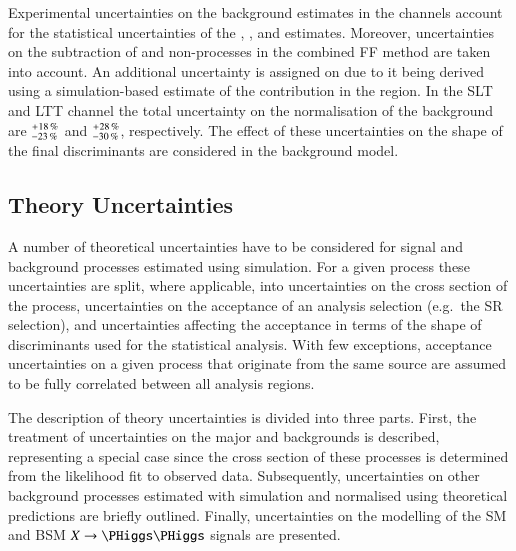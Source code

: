 Experimental uncertainties on the \faketauhadvis background estimates in the
\lephad channels account for the statistical uncertainties of the \FFqcd,
\FFttbar, and \rqcd estimates. Moreover, uncertainties on the subtraction of
\ttbar and non-\ttbar processes in the combined FF method are taken into
account. An additional uncertainty is assigned on \rqcd due to it being derived
using a simulation-based estimate of the \ttbarFakes contribution in the \antiid
region. In the \lephad SLT and LTT channel the total uncertainty on the
normalisation of the \faketauhadvis background are
$^{\hspace{0.25pt}+\hspace{0.25pt}18\,\%}_{-23\,\%}$ and
$^{\hspace{0.25pt}+\hspace{0.25pt}28\,\%}_{-30\,\%}$, respectively. The effect
of these uncertainties on the shape of the final discriminants are considered in
the background model.



\subsection{Theory Uncertainties}%
\label{sec:modelling_uncertainties}%
\label{sec:theory_uncertainties}

A number of theoretical uncertainties have to be considered for signal and
background processes estimated using simulation. For a given process these
uncertainties are split, where applicable, into uncertainties on the cross
section of the process, uncertainties on the acceptance of an analysis selection
(e.g.\ the SR selection), and uncertainties affecting the acceptance in terms of
the shape of discriminants used for the statistical analysis. With few
exceptions, acceptance uncertainties on a given process that originate from the
same source are assumed to be fully correlated between all analysis regions.

The description of theory uncertainties is divided into three parts.  First, the
treatment of uncertainties on the major \ZHF and \ttbar backgrounds is
described, representing a special case since the cross section of these
processes is determined from the likelihood fit to observed data. Subsequently,
uncertainties on other background processes estimated with simulation and
normalised using theoretical predictions are briefly outlined. Finally,
uncertainties on the modelling of the SM \HH and BSM $X \to \HH$ signals are
presented.

